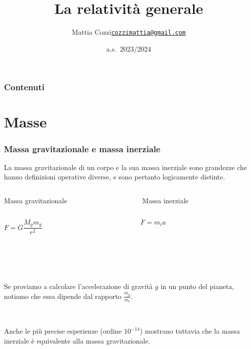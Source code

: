 \documentclass[]{beamer}
\title{La relatività generale}
\author{\texorpdfstring{Mattia Cozzi\newline\href{mailto:cozzimattia@gmail.com}{\texttt{cozzimattia@gmail.com}}}{Mattia Cozzi}}
\date{a.s.~2023/2024}
\theoremstyle{plain}
\begin{document}
\begin{frame}
  \titlepage
\end{frame}





\begin{frame}
\frametitle{Contenuti}
\tableofcontents
\end{frame}

\section{Masse}

\begin{frame}
\frametitle{Massa gravitazionale e massa inerziale}
La massa gravitazionale di un corpo e la sua massa inerziale sono grandezze che hanno definizioni operative diverse, e sono pertanto logicamente distinte.\pause

\begin{columns}
\begin{column}{0.5\textwidth}
\begin{center}
Massa gravitazionale
\end{center}
\end{column}
\begin{column}{0.5\textwidth}
\begin{center}
Massa inerziale

\end{center}
\end{column}
\end{columns}

\begin{columns}
\begin{column}{0.5\textwidth}
\begin{center}
$ F = G \dfrac{M_g m_g}{r^2} $
\end{center}
\end{column}
\begin{column}{0.5\textwidth}
\begin{center}
$ F = m_i a $
\end{center}
\end{column}
\end{columns}

~

~

{\pause}Se proviamo a calcolare l'accelerazione di gravità $ g $ in un punto del pianeta, notiamo che essa dipende dal rapporto $ \frac{m_g}{m_i} $.\pause


~

Anche le più precise esperienze (ordine $ 10^{-14} $) mostrano tuttavia che la massa inerziale è equivalente alla massa gravitazionale.
\end{frame}
\end{document}
